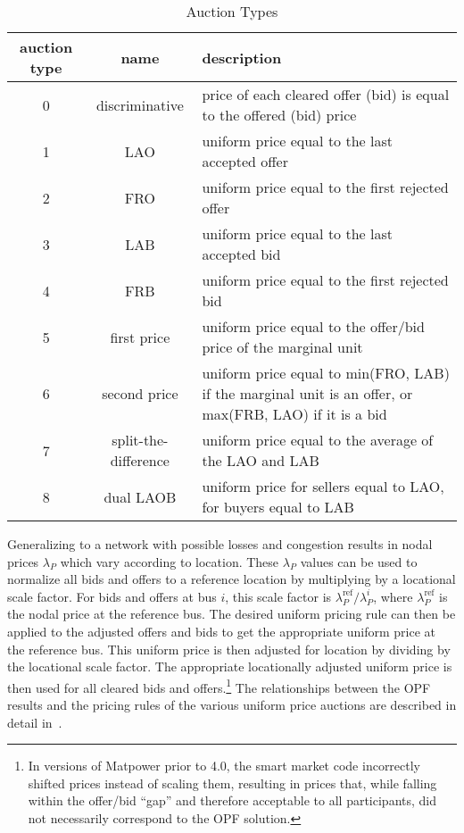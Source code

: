 \documentclass[12pt]{article}
\newcommand{\matpower}[0]{{\sc Matpower}}
\numberwithin{equation}{section}
\numberwithin{table}{section}
\numberwithin{figure}{section}
\begin{document}
\begin{appendices}
\begin{table}[!ht]
\centering
\begin{threeparttable}
\caption{Auction Types}
\label{tab:auction_types}
\footnotesize
\begin{tabular}{ccp{}}
\toprule
auction type & name & description \\
\midrule
0	& discriminative	& price of each cleared offer (bid) is equal to the offered (bid) price \\
1	& LAO	& uniform price equal to the last accepted offer \\
2	& FRO	& uniform price equal to the first rejected offer \\
3	& LAB	& uniform price equal to the last accepted bid \\
4	& FRB	& uniform price equal to the first rejected bid \\
5	& first price	& uniform price equal to the offer/bid price of the marginal unit \\
6	& second price	& uniform price equal to min(FRO, LAB) if the marginal unit is an offer, or max(FRB, LAO) if it is a bid \\
7	& split-the-difference	& uniform price equal to the average of the LAO and LAB \\
8	& dual LAOB	& uniform price for sellers equal to LAO, for buyers equal to LAB \\
\bottomrule
\end{tabular}
\end{threeparttable}
\end{table}

Generalizing to a network with possible losses and congestion results in nodal prices $\lambda_P$ which vary according to location. These $\lambda_P$ values can be used to normalize all bids and offers to a reference location by multiplying by a locational scale factor. For bids and offers at bus $i$, this scale factor is $\lambda_P^\mathrm{ref} / \lambda_P^i$, where $\lambda_P^\mathrm{ref}$ is the nodal price at the reference bus. The desired uniform pricing rule can then be applied to the adjusted offers and bids to get the appropriate uniform price at the reference bus. This uniform price is then adjusted for location by dividing by the locational scale factor. The appropriate locationally adjusted uniform price is then used for all cleared bids and offers.\footnote{In versions of \matpower{} prior to 4.0, the smart market code incorrectly shifted prices instead of scaling them, resulting in prices that, while falling within the offer/bid ``gap'' and therefore acceptable to all participants, did not necessarily correspond to the OPF solution.} The relationships between the OPF results and the pricing rules of the various uniform price auctions are described in detail in~\cite{zimmerman2010a}.


\end{appendices}
\end{document}
